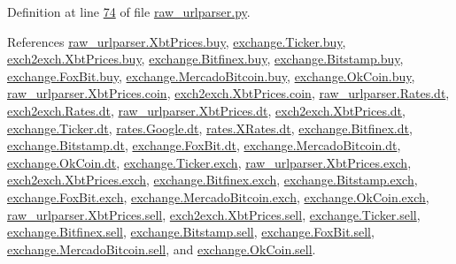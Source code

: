 Definition at line \hyperlink{raw__urlparser_8py_source_l00074}{74} of file \hyperlink{raw__urlparser_8py_source}{raw\+\_\+urlparser.\+py}.



References \hyperlink{raw__urlparser_8py_source_l00055}{raw\+\_\+urlparser.\+Xbt\+Prices.\+buy}, \hyperlink{exchange_8py_source_l00058}{exchange.\+Ticker.\+buy}, \hyperlink{exch2exch_8py_source_l00059}{exch2exch.\+Xbt\+Prices.\+buy}, \hyperlink{exchange_8py_source_l00331}{exchange.\+Bitfinex.\+buy}, \hyperlink{exchange_8py_source_l00400}{exchange.\+Bitstamp.\+buy}, \hyperlink{exchange_8py_source_l00472}{exchange.\+Fox\+Bit.\+buy}, \hyperlink{exchange_8py_source_l00534}{exchange.\+Mercado\+Bitcoin.\+buy}, \hyperlink{exchange_8py_source_l00599}{exchange.\+Ok\+Coin.\+buy}, \hyperlink{raw__urlparser_8py_source_l00057}{raw\+\_\+urlparser.\+Xbt\+Prices.\+coin}, \hyperlink{exch2exch_8py_source_l00065}{exch2exch.\+Xbt\+Prices.\+coin}, \hyperlink{raw__urlparser_8py_source_l00024}{raw\+\_\+urlparser.\+Rates.\+dt}, \hyperlink{exch2exch_8py_source_l00028}{exch2exch.\+Rates.\+dt}, \hyperlink{raw__urlparser_8py_source_l00053}{raw\+\_\+urlparser.\+Xbt\+Prices.\+dt}, \hyperlink{exch2exch_8py_source_l00057}{exch2exch.\+Xbt\+Prices.\+dt}, \hyperlink{exchange_8py_source_l00057}{exchange.\+Ticker.\+dt}, \hyperlink{rates_8py_source_l00089}{rates.\+Google.\+dt}, \hyperlink{rates_8py_source_l00145}{rates.\+X\+Rates.\+dt}, \hyperlink{exchange_8py_source_l00338}{exchange.\+Bitfinex.\+dt}, \hyperlink{exchange_8py_source_l00407}{exchange.\+Bitstamp.\+dt}, \hyperlink{exchange_8py_source_l00471}{exchange.\+Fox\+Bit.\+dt}, \hyperlink{exchange_8py_source_l00541}{exchange.\+Mercado\+Bitcoin.\+dt}, \hyperlink{exchange_8py_source_l00606}{exchange.\+Ok\+Coin.\+dt}, \hyperlink{exchange_8py_source_l00055}{exchange.\+Ticker.\+exch}, \hyperlink{raw__urlparser_8py_source_l00056}{raw\+\_\+urlparser.\+Xbt\+Prices.\+exch}, \hyperlink{exch2exch_8py_source_l00064}{exch2exch.\+Xbt\+Prices.\+exch}, \hyperlink{exchange_8py_source_l00325}{exchange.\+Bitfinex.\+exch}, \hyperlink{exchange_8py_source_l00397}{exchange.\+Bitstamp.\+exch}, \hyperlink{exchange_8py_source_l00465}{exchange.\+Fox\+Bit.\+exch}, \hyperlink{exchange_8py_source_l00531}{exchange.\+Mercado\+Bitcoin.\+exch}, \hyperlink{exchange_8py_source_l00596}{exchange.\+Ok\+Coin.\+exch}, \hyperlink{raw__urlparser_8py_source_l00054}{raw\+\_\+urlparser.\+Xbt\+Prices.\+sell}, \hyperlink{exch2exch_8py_source_l00058}{exch2exch.\+Xbt\+Prices.\+sell}, \hyperlink{exchange_8py_source_l00059}{exchange.\+Ticker.\+sell}, \hyperlink{exchange_8py_source_l00332}{exchange.\+Bitfinex.\+sell}, \hyperlink{exchange_8py_source_l00401}{exchange.\+Bitstamp.\+sell}, \hyperlink{exchange_8py_source_l00473}{exchange.\+Fox\+Bit.\+sell}, \hyperlink{exchange_8py_source_l00535}{exchange.\+Mercado\+Bitcoin.\+sell}, and \hyperlink{exchange_8py_source_l00600}{exchange.\+Ok\+Coin.\+sell}.


